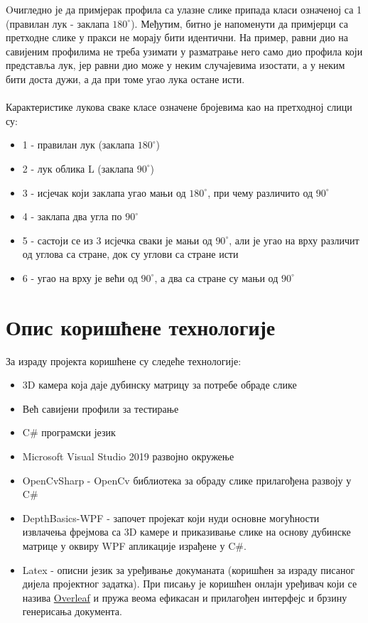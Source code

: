 \documentclass[12pt]{article}
\begin{document}
\indent\indent Oчигледно је да примјерак профила са улазне слике припада класи означеној са 1 (правилан лук - заклапа $180^\circ$). Међутим, битно је напоменути да примјерци са претходне слике у пракси не морају бити идентични. На пример, равни дио на савијеним профилима не треба узимати у разматрање него само дио профила који представља лук, јер равни дио може у неким случајевима изостати, а у неким бити доста дужи, а да при томе угао лука остане исти.\\\\
\indent Карактеристике лукова сваке класе означене бројевима као на претходној слици су:
\begin{itemize}
  \item 1 - правилан лук (заклапа $180^\circ$)
  \item 2 - лук облика L (заклапа $90^\circ$)
  \item 3 - исјечак који заклапа угао мањи од $180^\circ$, при чему различито од $90^\circ$
  \item 4 - заклапа два угла по $90^\circ$
  \item 5 - састоји се из 3 исјечка сваки је мањи од $90^\circ$, али је угао на врху различит од углова са стране, док су углови са стране исти
  \item 6 - угао на врху је већи од $90^\circ$, а два са стране су мањи од $90^\circ$
\end{itemize}

\newpage

\section{Опис коришћене технологије}
За израду пројекта коришћене су следеће технологије:
\begin{itemize}
    \item 3D камера која даје дубинску матрицу за потребе обраде слике
    \item Већ савијени профили за тестирање
    \item C\# програмски језик
    \item Microsoft Visual Studio 2019 развојно окружење
    \item OpenCvSharp - OpenCv библиотека за обраду слике прилагођена развоју у C\#
    \item DepthBasics-WPF - започет пројекат који нуди основне могућности извлачења фрејмова са 3D камере и приказивање слике на основу дубинске матрице у оквиру WPF апликације израђене у C\#.
    \item Latex - описни језик за уређивање докуманата (коришћен  за израду писаног дијела пројектног задатка). При писању је коришћен онлајн уређивач који се назива \href{https://www.overleaf.com/project}{Overleaf} и пружа веома ефикасан и прилагођен интерфејс и брзину генерисања документа.
\end{itemize}
\end{document}
